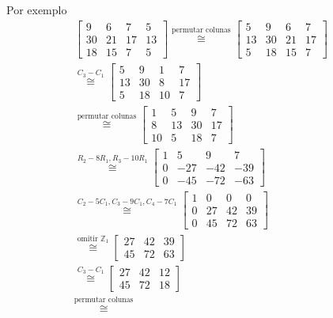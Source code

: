 	\par\vspace{0.3cm} Por exemplo
	\begin{align*}
	\begin{bmatrix}
	9 & 6 & 7 & 5 \\
	30 & 21 & 17 & 13 \\
	18 & 15 & 7 & 5
	\end{bmatrix} \stackrel{\text{permutar colunas}}{\cong} 
	\begin{bmatrix}
	5 & 9 & 6 & 7 \\
	13 & 30 & 21 & 17 \\
	5 & 18 & 15 & 7
	\end{bmatrix}& \\ \stackrel{C_3 - C_1}{\cong}
	\begin{bmatrix}
	5 & 9 & 1 & 7 \\
	13 & 30 & 8 & 17 \\
	5 & 18 & 10 & 7
	\end{bmatrix}& \\ \stackrel{\text{permutar colunas}}{\cong}
	\begin{bmatrix}
	1 & 5 & 9 & 7 \\
	8 & 13 & 30 & 17 \\
	10 & 5 & 18 & 7
	\end{bmatrix}& \\ \stackrel{R_2 - 8R_1, R_3 - 10R_1}{\cong}
	\begin{bmatrix}
	1 & 5 & 9 & 7 \\
	0 & -27 & -42 & -39 \\
	0 & -45 & -72 & -63 
	\end{bmatrix}& \\ \stackrel{C_2 - 5C_1, C_3 - 9C_1, C_4 - 7C_1}{\cong} 
	\begin{bmatrix}
	1 & 0 & 0 & 0 \\
	0 & 27 & 42 & 39 \\
	0 & 45 & 72 & 63
	\end{bmatrix}& \\ \stackrel{\text{omitir }\mathbb{Z}_1}{\cong}
	\begin{bmatrix}
	27 & 42 & 39 \\
	45 & 72 & 63
	\end{bmatrix}& \\ \stackrel{C_3 - C_1}{\cong}
	\begin{bmatrix}
	27 & 42 & 12 \\
	45 & 72 & 18
	\end{bmatrix}& \\ \stackrel{\text{permutar colunas}}{\cong}

\end{align*}
